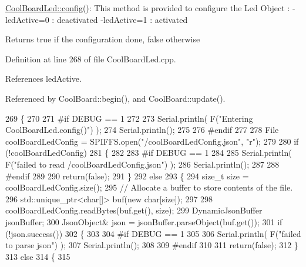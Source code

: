 \hyperlink{classCoolBoardLed_a1b60e5e30bea96c49ed62ed1bf1ffc8b}{Cool\+Board\+Led\+::config()}\+: This method is provided to configure the Led Object \+: -\/led\+Active=0 \+: deactivated -\/led\+Active=1 \+: activated \begin{DoxyReturn}{Returns}
true if the configuration done, false otherwise 
\end{DoxyReturn}


Definition at line 268 of file Cool\+Board\+Led.\+cpp.



References led\+Active.



Referenced by Cool\+Board\+::begin(), and Cool\+Board\+::update().


\begin{DoxyCode}
269 \{
270 
271 \textcolor{preprocessor}{#if DEBUG == 1 }
272         
273     Serial.println( F(\textcolor{stringliteral}{"Entering CoolBoardLed.config()"}) );
274     Serial.println();
275 
276 \textcolor{preprocessor}{#endif}
277     
278     File coolBoardLedConfig = SPIFFS.open(\textcolor{stringliteral}{"/coolBoardLedConfig.json"}, \textcolor{stringliteral}{"r"});
279 
280     \textcolor{keywordflow}{if} (!coolBoardLedConfig) 
281     \{
282     
283 \textcolor{preprocessor}{    #if DEBUG == 1}
284 
285         Serial.println( F(\textcolor{stringliteral}{"failed to read /coolBoardLedConfig.json"}) );
286         Serial.println();
287 
288 \textcolor{preprocessor}{    #endif}
289 
290         \textcolor{keywordflow}{return}(\textcolor{keyword}{false});
291     \}
292     \textcolor{keywordflow}{else}
293     \{
294         \textcolor{keywordtype}{size\_t} size = coolBoardLedConfig.size();
295         \textcolor{comment}{// Allocate a buffer to store contents of the file.}
296         std::unique\_ptr<char[]> buf(\textcolor{keyword}{new} \textcolor{keywordtype}{char}[size]);
297 
298         coolBoardLedConfig.readBytes(buf.get(), size);
299         DynamicJsonBuffer jsonBuffer;
300         JsonObject& json = jsonBuffer.parseObject(buf.get());
301         \textcolor{keywordflow}{if} (!json.success()) 
302         \{
303         
304 \textcolor{preprocessor}{        #if DEBUG == 1}
305 
306             Serial.println( F(\textcolor{stringliteral}{"failed to parse json"}) );
307             Serial.println();
308         
309 \textcolor{preprocessor}{        #endif}
310 
311             \textcolor{keywordflow}{return}(\textcolor{keyword}{false});
312         \} 
313         \textcolor{keywordflow}{else}
314         \{
315         

\end{DoxyCode}

